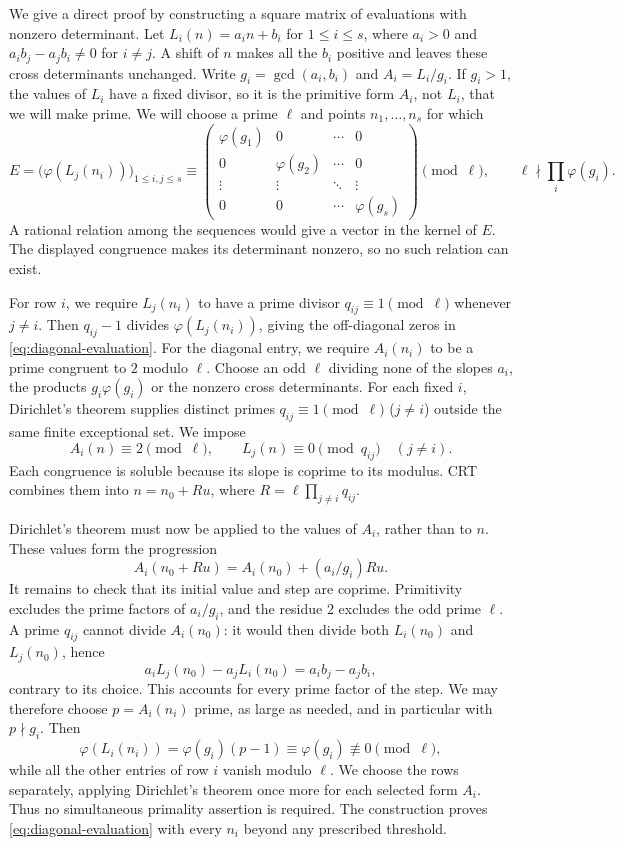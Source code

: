 \documentclass[11pt]{article}
\begin{document}
We give a direct proof by constructing a square matrix of evaluations
with nonzero determinant. Let
$L_i(n)=a_i n+b_i$ for $1\le i\le s$, where $a_i>0$ and
$a_i b_j-a_j b_i\ne0$ for $i\ne j$. A shift of $n$ makes all the
$b_i$ positive and leaves these cross determinants unchanged.
Write $g_i=\gcd(a_i,b_i)$ and $A_i=L_i/g_i$. If $g_i>1$, the
values of $L_i$ have a fixed divisor, so it is the primitive form
$A_i$, not $L_i$, that we will make prime. We will choose a prime
$\ell$ and points $n_1,\ldots,n_s$ for which
\begin{equation}\label{eq:diagonal-evaluation}
 E=\bigl(\varphi(L_j(n_i))\bigr)_{1\le i,j\le s}
 \equiv
 \begin{pmatrix}
 \varphi(g_1)&0&\cdots&0\\
 0&\varphi(g_2)&\cdots&0\\
 \vdots&\vdots&\ddots&\vdots\\
 0&0&\cdots&\varphi(g_s)
 \end{pmatrix}\pmod\ell,
 \qquad \ell\nmid\prod_i\varphi(g_i).
\end{equation}
A rational relation among the sequences would give a vector in the
kernel of $E$. The displayed congruence makes its determinant nonzero,
so no such relation can exist.

For row $i$, we require $L_j(n_i)$ to have a prime divisor
$q_{ij}\equiv1\pmod\ell$ whenever $j\ne i$. Then $q_{ij}-1$
divides $\varphi(L_j(n_i))$, giving the off-diagonal zeros in
\eqref{eq:diagonal-evaluation}. For the diagonal entry, we require
$A_i(n_i)$ to be a prime congruent to $2$ modulo $\ell$.
Choose an odd $\ell$ dividing none of the slopes $a_i$, the products
$g_i\varphi(g_i)$ or the nonzero cross determinants. For each fixed
$i$, Dirichlet's theorem supplies distinct primes
$q_{ij}\equiv1\pmod\ell$ ($j\ne i$) outside the same finite exceptional
set. We impose
\[
 A_i(n)\equiv2\pmod\ell,\qquad
 L_j(n)\equiv0\pmod{q_{ij}}\quad(j\ne i).
\]
Each congruence is soluble because its slope is coprime to its
modulus. CRT combines them into $n=n_0+Ru$, where
$R=\ell\prod_{j\ne i}q_{ij}$.

Dirichlet's theorem must now be applied to the values of $A_i$, rather
than to $n$. These values form the progression
\[
 A_i(n_0+Ru)=A_i(n_0)+(a_i/g_i)Ru.
\]
It remains to check that its initial value and step are coprime.
Primitivity excludes the prime factors of $a_i/g_i$, and the residue
$2$ excludes the odd prime $\ell$. A prime $q_{ij}$ cannot divide
$A_i(n_0)$: it would then divide both $L_i(n_0)$ and $L_j(n_0)$, hence
\[
 a_iL_j(n_0)-a_jL_i(n_0)=a_i b_j-a_j b_i,
\]
contrary to its choice. This accounts for every prime factor of the
step. We may therefore choose $p=A_i(n_i)$ prime, as large as needed,
and in particular with $p\nmid g_i$. Then
\[
 \varphi(L_i(n_i))=\varphi(g_i)(p-1)
       \equiv\varphi(g_i)\not\equiv0\pmod\ell,
\]
while all the other entries of row $i$ vanish modulo $\ell$.
We choose the rows separately, applying Dirichlet's theorem once
more for each selected form $A_i$. Thus no simultaneous primality
assertion is required. The construction proves
\eqref{eq:diagonal-evaluation} with every $n_i$ beyond any prescribed
threshold.
\end{document}
